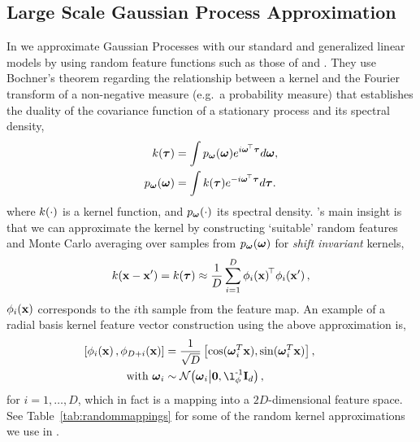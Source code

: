 \documentclass[11pt, oneside]{article}
\begin{document}
\subsection{Large Scale Gaussian Process Approximation}

In \revrand{} we approximate Gaussian Processes \citep{Rasmussen2006} with
our standard and generalized linear models by using random feature functions
such as those of \citeauthor{rahimi2007} \citeyearpar{rahimi2007,rahimi2008}
and \cite{le2013fastfood}. They use Bochner's theorem regarding the
relationship between a kernel and the Fourier transform of a non-negative
measure (e.g.~a probability measure) that establishes the duality of the
covariance function of a stationary process and its spectral density,
\begin{align}
	k(\boldsymbol{\tau}) &= \int p_{\boldsymbol{\omega}}(\boldsymbol{\omega}) 
    e^{i \boldsymbol{\omega}^{\!\top}  \boldsymbol{\tau}} d \boldsymbol{\omega},  \\
	p_{\boldsymbol{\omega}}(\boldsymbol{\omega}) &= \int k(\boldsymbol{\tau}) 
    e^{- i \boldsymbol{\omega}^{\!\top} \boldsymbol{\tau}}  d \boldsymbol{\tau}.
	\label{eq:fourier}
\end{align}
where $k(\cdot)$ is a kernel function, and $p_{\boldsymbol{\omega}}(\cdot)$ its
spectral density. \citeauthor{rahimi2007}'s  main insight
\citeyearpar{rahimi2007} is that we can approximate the kernel by constructing
`suitable' random features and Monte Carlo averaging over samples from
$p_{\boldsymbol{\omega}}(\boldsymbol{\omega})$ for \emph{shift invariant} kernels,
\begin{equation}
    k(\mathbf{x} - \mathbf{x}') = k(\boldsymbol{\tau}) 
    \approx \frac{1}{D} \sum_{i=1}^{D} \phi_{i}\!\left({{\mathbf{x}}}\right)^{\!\top}\!
	\phi_{i}\!\left({{\mathbf{x}'}}\right),
	\label{eq:mcapprox}
\end{equation}
$\phi_{i}\!\left({{\mathbf{x}}}\right)$ corresponds to the $i$th sample from the feature
map. An example of a radial basis kernel feature vector construction using the 
above approximation is,
\begin{align}
	\nonumber
    \sbrac{\singlefeatfunc{\inss}{i}, \singlefeatfunc{\inss}{D+i}}&= 
    \frac{1}{\sqrt{D}} \sbrac{\cos(\ffourier_i^T \inss), 
    \sin(\ffourier_i^T \inss)}, \qquad \\
    \text{with}~\ffourier_i & \sim 
    \gausC{\ffourier_i}{\mathbf{0}, \lenscale\inv \ident{d}},
\end{align}
for $i=1, \ldots, D$,  which in fact is a mapping into a $2 D$-dimensional
feature space. See Table~\ref{tab:randommappings} for some of the random kernel
approximations we use in \revrand{}.
\end{document}
